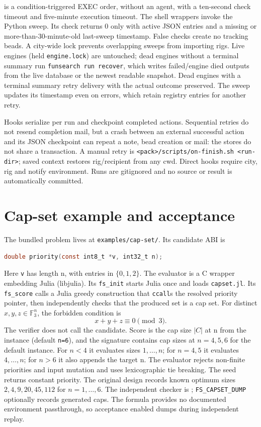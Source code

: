 \documentclass[11pt]{article}
\newcommand{\code}[1]{\texttt{#1}}
\begin{document}
 is a condition-triggered EXEC order, without
an agent, with a ten-second check timeout and five-minute execution timeout.
The shell wrappers invoke the Python sweep. Its check returns 0 only with active
JSON entries and a missing or more-than-30-minute-old last-sweep timestamp.
False checks create no tracking beads. A city-wide lock prevents overlapping
sweeps from importing rigs. Live engines (held \code{engine.lock}) are untouched; dead engines without a
terminal summary run \code{funsearch run recover}, which writes failed/engine
died outputs from the live database or the newest readable snapshot. Dead engines with a terminal summary retry delivery with
the actual outcome preserved. The sweep updates its timestamp even on errors,
which retain registry entries for another retry.

Hooks serialize per run and checkpoint completed actions. Sequential retries do
not resend completion mail, but a crash between an external successful action
and its JSON checkpoint can repeat a note, bead creation or mail: the stores do
not share a transaction. A manual retry is
\code{<pack>/scripts/on-finish.sh <run-dir>}; saved context restores rig/recipient
from any cwd. Direct hooks require city, rig and notify environment. Runs are
gitignored and no source or result is automatically committed.

\section{Cap-set example and acceptance}
The bundled problem lives at \code{examples/cap-set/}. Its candidate ABI is
\begin{lstlisting}[language=C]
double priority(const int8_t *v, int32_t n);
\end{lstlisting}
Here \code{v} has length n, with entries in $\{0,1,2\}$. The evaluator is a C
wrapper embedding Julia (libjulia). Its \code{fs\_init} starts Julia once and
loads \code{capset.jl}. Its \code{fs\_score} calls a Julia greedy construction
that \code{ccall}s the resolved priority pointer, then independently checks that
the produced set is a cap set. For distinct $x,y,z\in\mathbb{F}_3^n$, the
forbidden condition is
\[
 x+y+z\equiv 0\pmod 3.
\]
The verifier does not call the candidate. Score is the cap size $|C|$ at n
from the instance (default \code{n=6}), and the signature contains cap sizes
at $n=4,5,6$ for the default instance. For $n<4$ it evaluates sizes $1,\ldots,n$;
for $n=4,5$ it evaluates $4,\ldots,n$; for $n>6$ it also appends the target n.
The evaluator rejects non-finite priorities and input mutation and uses
lexicographic tie breaking. The seed returns constant priority. The original
design records known optimum sizes $2,4,9,20,45,112$ for $n=1,\ldots,6$.
The independent checker is ; \code{FS\_CAPSET\_DUMP}
optionally records generated caps. The formula provides no documented
environment passthrough, so acceptance enabled dumps during independent replay.
\end{document}

